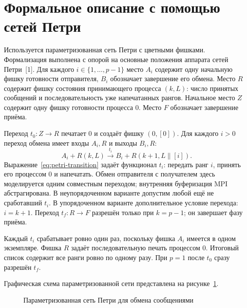 \documentclass[14pt,a4paper]{extarticle}
\begin{document}
\section{Формальное описание с помощью сетей Петри}

Используется параметризованная сеть Петри с цветными фишками. Формализация
выполнена с опорой на основные положения аппарата сетей Петри~[1].
Для каждого $i\in\{1,\ldots,p-1\}$ место $A_i$ содержит одну начальную
фишку готовности отправителя, $B_i$ обозначает завершение его обмена.
Место $R$ содержит фишку состояния принимающего процесса $(k,L)$:
число принятых сообщений и последовательность уже напечатанных рангов.
Начальное место $Z$ содержит одну фишку готовности процесса 0.
Место $F$ обозначает завершение приёма.

Переход $t_0:Z\to R$ печатает 0 и создаёт фишку $(0,[0])$.
Для каждого $i>0$ переход обмена имеет входы $A_i,R$ и выходы $B_i,R$:
\begin{equation}
\label{eq:petri-transition}
 A_i+R(k,L)\xrightarrow{t_i}B_i+R(k+1,L\mathbin{\|}[i]).
\end{equation}
Выражение~\eqref{eq:petri-transition} задаёт функционал $t_i$: передать
ранг $i$, принять его процессом 0 и напечатать.
Обмен отправителя с получателем здесь моделируется одним совместным
переходом; внутренняя буферизация MPI абстрагирована.
В неупорядоченном варианте допустим любой ещё не сработавший $t_i$.
В упорядоченном варианте дополнительное условие перехода: $i=k+1$.
Переход $t_f:R\to F$ разрешён только при $k=p-1$; он завершает фазу приёма.

Каждый $t_i$ срабатывает ровно один раз, поскольку фишка $A_i$ имеется
в одном экземпляре. Фишка $R$ задаёт последовательную печать процессом 0.
Итоговый список содержит все ранги ровно по одному разу.
При $p=1$ после $t_0$ сразу разрешён $t_f$.

Графическая схема параметризованной сети представлена на
рисунке~\ref{fig:petri-net}.

\begin{figure}[H]
    \centering
    \caption{Параметризованная сеть Петри для обмена сообщениями}
    \label{fig:petri-net}
\end{figure}
\end{document}

